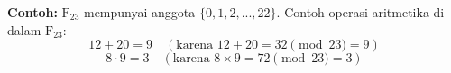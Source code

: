\documentclass{article}
\begin{document}

\textbf{Contoh:} $\mathrm{F}_{23}$ mempunyai anggota $\{0, 1, 2, ..., 22\}$.
Contoh operasi aritmetika di dalam $\mathrm{F}_{23}$:
\[ 12 + 20 = 9 \quad (\text{karena } 12 + 20 = 32 \pmod{23} = 9) \]
\[ 8 \cdot 9 = 3 \quad (\text{karena } 8 \times 9 = 72 \pmod{23} = 3) \]
\end{document}
